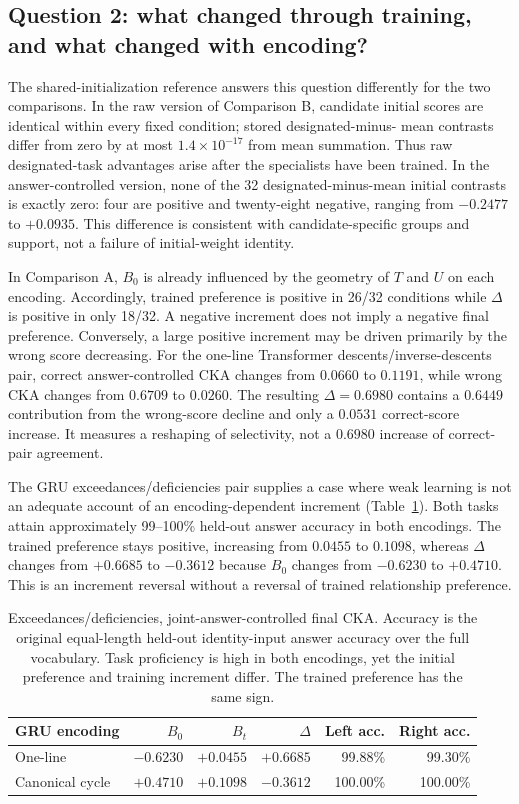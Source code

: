 \documentclass[10pt]{article}
\begin{document}
\subsection{Question 2: what changed through training, and what changed with encoding?}
The shared-initialization reference answers this question differently for
the two comparisons. In the raw version of Comparison B, candidate initial
scores are identical within every fixed condition; stored designated-minus-
mean contrasts differ from zero by at most $1.4\times10^{-17}$ from mean
summation. Thus raw designated-task advantages arise after the specialists
have been trained. In the answer-controlled version, none of the 32
designated-minus-mean initial contrasts is exactly zero: four are positive
and twenty-eight negative, ranging from $-0.2477$ to $+0.0935$.
This difference is consistent with candidate-specific groups and support,
not a failure of initial-weight identity.

In Comparison A, $B_0$ is already influenced by the geometry of $T$ and
$U$ on each encoding. Accordingly, trained preference is positive in
26/32 conditions while $\Delta$ is positive in only 18/32. A negative
increment does not imply a negative final preference. Conversely, a large
positive increment may be driven primarily by the wrong score decreasing.
For the one-line Transformer descents/inverse-descents pair, correct
answer-controlled CKA changes from $0.0660$ to $0.1191$, while wrong CKA
changes from $0.6709$ to $0.0260$. The resulting $\Delta=0.6980$ contains
a $0.6449$ contribution from the wrong-score decline and only a $0.0531$
correct-score increase. It measures a reshaping of selectivity, not a
$0.6980$ increase of correct-pair agreement.

The GRU exceedances/deficiencies pair supplies a case where weak learning
is not an adequate account of an encoding-dependent increment
(Table~\ref{tab:gruexample}). Both tasks attain approximately 99--100\%
held-out answer accuracy in both encodings. The trained preference stays
positive, increasing from $0.0455$ to $0.1098$, whereas $\Delta$ changes
from $+0.6685$ to $-0.3612$ because $B_0$ changes from $-0.6230$ to
$+0.4710$. This is an increment reversal without a reversal of trained
relationship preference.

\begin{table}[t]
\centering\small
\begin{tabular}{lrrrrr}
\toprule
GRU encoding & $B_0$ & $B_t$ & $\Delta$ & Left acc. & Right acc.\\
\midrule
One-line & $-0.6230$ & $+0.0455$ & $+0.6685$ & 99.88\% & 99.30\%\\
Canonical cycle & $+0.4710$ & $+0.1098$ & $-0.3612$ & 100.00\% & 100.00\%\\
\bottomrule
\end{tabular}
\caption{Exceedances/deficiencies, joint-answer-controlled final CKA.
Accuracy is the original equal-length held-out identity-input answer
accuracy over the full vocabulary. Task proficiency is high in both
encodings, yet the initial preference and training increment differ.
The trained preference has the same sign.}
\label{tab:gruexample}
\end{table}
\end{document}
